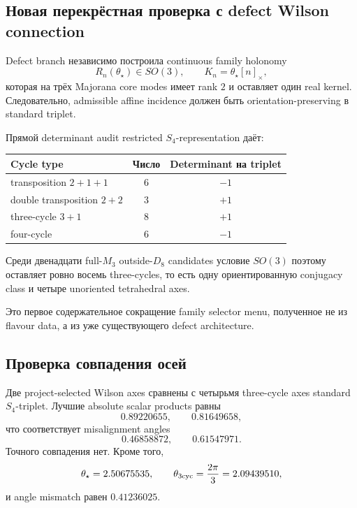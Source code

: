 \subsection{Новая перекрёстная проверка с defect Wilson connection}

Defect branch независимо построила continuous family holonomy
\begin{equation}
 R_n(\theta_\star)\in SO(3),
 \qquad
 K_n=\theta_\star[n]_\times,
\end{equation}
которая на трёх Majorana core modes имеет rank \(2\) и оставляет один
real kernel. Следовательно, admissible affine incidence должен быть
orientation-preserving в standard triplet.

Прямой determinant audit restricted \(S_4\)-representation даёт:
\begin{center}
\begin{tabular}{lcc}
\toprule
Cycle type & Число & Determinant на triplet\\
\midrule
transposition \(2+1+1\) & 6 & \(-1\)\\
double transposition \(2+2\) & 3 & \(+1\)\\
three-cycle \(3+1\) & 8 & \(+1\)\\
four-cycle & 6 & \(-1\)\\
\bottomrule
\end{tabular}
\end{center}
Среди двенадцати full-\(M_3\) outside-\(D_8\) candidates условие
\(SO(3)\) поэтому оставляет ровно восемь three-cycles, то есть одну
ориентированную conjugacy class и четыре unoriented tetrahedral axes.

Это первое содержательное сокращение family selector menu, полученное не
из flavour data, а из уже существующего defect architecture.

\subsection{Проверка совпадения осей}

Две project-selected Wilson axes сравнены с четырьмя three-cycle axes
standard \(S_4\)-triplet. Лучшие absolute scalar products равны
\begin{equation}
 0.89220655,
 \qquad
 0.81649658,
\end{equation}
что соответствует misalignment angles
\begin{equation}
 0.46858872,
 \qquad
 0.61547971.
\end{equation}
Точного совпадения нет. Кроме того,
\begin{equation}
 \theta_\star=2.50675535,
 \qquad
 \theta_{3{\rm cyc}}=\frac{2\pi}{3}=2.09439510,
\end{equation}
и angle mismatch равен \(0.41236025\).


